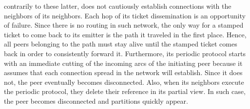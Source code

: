 \begin{asparadesc}
  contrarily to these latter, \SCAMP does not cautiously establish connections
  with the neighbors of its neighbors.  Each hop of its ticket dissemination is
  an opportunity of failure. Since there is no routing in such network, the
  only way for a stamped ticket to come back to its emitter is the path it
  traveled in the first place. Hence, all peers belonging to the path must stay
  alive until the stamped ticket comes back in order to consistently forward
  it.  Furthermore, its periodic protocol starts with an immediate cutting of
  the incoming arcs of the initiating peer because it assumes that each
  connection spread in the network will establish.  Since it does not, the peer
  eventually becomes disconnected. Also, when its neighbors execute the
  periodic protocol, they delete their reference in its partial view. In such
  case, the peer becomes disconnected and partitions quickly appear.
\end{asparadesc}


